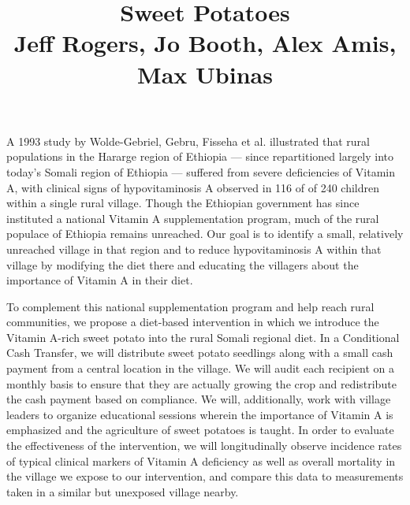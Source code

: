 \documentclass[12pt, letterpaper, draft]{article}
\begin{document}
\title{Sweet Potatoes\\ \small{Jeff Rogers, Jo Booth, Alex Amis, Max Ubinas}}
\author{}
\date{\vspace{-13ex}}
\maketitle

\thispagestyle{empty}
\pagestyle{empty}

A 1993 study by Wolde-Gebriel, Gebru, Fisseha et al. illustrated that rural populations in the Hararge region of Ethiopia --- since repartitioned largely into today's Somali region of Ethiopia --- suffered from severe deficiencies of Vitamin A, with clinical signs of hypovitaminosis A observed in 116 of of 240 children within a single rural village. Though the Ethiopian government has since instituted a national Vitamin A supplementation program, much of the rural populace of Ethiopia remains unreached. Our goal is to identify a small, relatively unreached village in that region and to reduce hypovitaminosis A within that village by modifying the diet there and educating the villagers about the importance of Vitamin A in their diet.

To complement this national supplementation program and help reach rural communities, we propose a diet-based intervention in which we introduce the Vitamin A-rich sweet potato into the rural Somali regional diet. In a Conditional Cash Transfer, we will distribute sweet potato seedlings along with a small cash payment from a central location in the village. We will audit each recipient on a monthly basis to ensure that they are actually growing the crop and redistribute the cash payment based on compliance. We will, additionally, work with village leaders to organize educational sessions wherein the importance of Vitamin A is emphasized and the agriculture of sweet potatoes is taught. In order to evaluate the effectiveness of the intervention, we will longitudinally observe incidence rates of typical clinical markers of Vitamin A deficiency as well as overall mortality in the village we expose to our intervention, and compare this data to measurements taken in a similar but unexposed village nearby. 
\end{document}
